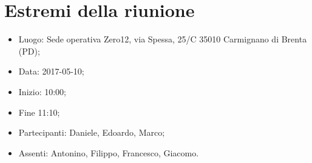 \documentclass[../verbale-2017-05-10.tex]{subfiles}
\begin{document}
\section{Estremi della riunione}
	\begin{itemize}
		\item Luogo: Sede operativa Zero12, via Spessa, 25/C 35010 Carmignano di Brenta (PD); 
        \item Data: 2017-05-10;
        \item Inizio: 10:00;
        \item Fine 11:10;
		\item Partecipanti: Daniele, Edoardo, Marco;
        \item Assenti: Antonino, Filippo, Francesco, Giacomo.
	\end{itemize}
\end{document}
